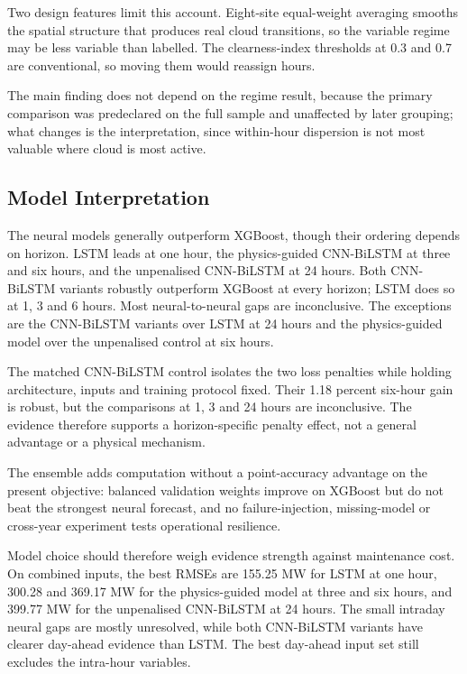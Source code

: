 Two design features limit this account. Eight-site equal-weight averaging smooths the spatial structure that produces real cloud transitions, so the variable regime may be less variable than labelled. The clearness-index thresholds at 0.3 and 0.7 are conventional, so moving them would reassign hours.

The main finding does not depend on the regime result, because the primary comparison was predeclared on the full sample and unaffected by later grouping; what changes is the interpretation, since within-hour dispersion is not most valuable where cloud is most active.

\subsection{Model Interpretation}

The neural models generally outperform XGBoost, though their ordering depends on horizon. LSTM leads at one hour, the physics-guided CNN-\allowbreak{}BiLSTM at three and six hours, and the unpenalised CNN-\allowbreak{}BiLSTM at 24 hours. Both CNN-\allowbreak{}BiLSTM variants robustly outperform XGBoost at every horizon; LSTM does so at 1, 3 and 6 hours. Most neural-to-neural gaps are inconclusive. The exceptions are the CNN-\allowbreak{}BiLSTM variants over LSTM at 24 hours and the physics-guided model over the unpenalised control at six hours.

The matched CNN-\allowbreak{}BiLSTM control isolates the two loss penalties while holding architecture, inputs and training protocol fixed. Their 1.18 percent six-hour gain is robust, but the comparisons at 1, 3 and 24 hours are inconclusive. The evidence therefore supports a horizon-specific penalty effect, not a general advantage or a physical mechanism.

The ensemble adds computation without a point-accuracy advantage on the present objective: balanced validation weights improve on XGBoost but do not beat the strongest neural forecast, and no failure-injection, missing-model or cross-year experiment tests operational resilience.

Model choice should therefore weigh evidence strength against maintenance cost. On combined inputs, the best RMSEs are 155.25 MW for LSTM at one hour, 300.28 and 369.17 MW for the physics-guided model at three and six hours, and 399.77 MW for the unpenalised CNN-\allowbreak{}BiLSTM at 24 hours. The small intraday neural gaps are mostly unresolved, while both CNN-\allowbreak{}BiLSTM variants have clearer day-ahead evidence than LSTM. The best day-ahead input set still excludes the intra-hour variables.

